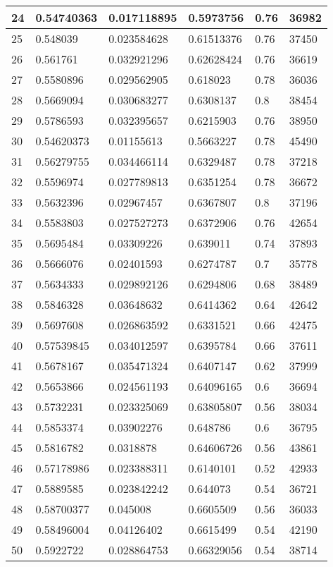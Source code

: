 \begin{longtable}{|l|l|l|l|l|l|}
24 & 0.54740363 & 0.017118895 & 0.5973756 & 0.76 & 36982 \\ \hline 
25 & 0.548039 & 0.023584628 & 0.61513376 & 0.76 & 37450 \\ \hline 
26 & 0.561761 & 0.032921296 & 0.62628424 & 0.76 & 36619 \\ \hline 
27 & 0.5580896 & 0.029562905 & 0.618023 & 0.78 & 36036 \\ \hline 
28 & 0.5669094 & 0.030683277 & 0.6308137 & 0.8 & 38454 \\ \hline 
29 & 0.5786593 & 0.032395657 & 0.6215903 & 0.76 & 38950 \\ \hline 
30 & 0.54620373 & 0.01155613 & 0.5663227 & 0.78 & 45490 \\ \hline 
31 & 0.56279755 & 0.034466114 & 0.6329487 & 0.78 & 37218 \\ \hline 
32 & 0.5596974 & 0.027789813 & 0.6351254 & 0.78 & 36672 \\ \hline 
33 & 0.5632396 & 0.02967457 & 0.6367807 & 0.8 & 37196 \\ \hline 
34 & 0.5583803 & 0.027527273 & 0.6372906 & 0.76 & 42654 \\ \hline 
35 & 0.5695484 & 0.03309226 & 0.639011 & 0.74 & 37893 \\ \hline 
36 & 0.5666076 & 0.02401593 & 0.6274787 & 0.7 & 35778 \\ \hline 
37 & 0.5634333 & 0.029892126 & 0.6294806 & 0.68 & 38489 \\ \hline 
38 & 0.5846328 & 0.03648632 & 0.6414362 & 0.64 & 42642 \\ \hline 
39 & 0.5697608 & 0.026863592 & 0.6331521 & 0.66 & 42475 \\ \hline 
40 & 0.57539845 & 0.034012597 & 0.6395784 & 0.66 & 37611 \\ \hline 
41 & 0.5678167 & 0.035471324 & 0.6407147 & 0.62 & 37999 \\ \hline 
42 & 0.5653866 & 0.024561193 & 0.64096165 & 0.6 & 36694 \\ \hline 
43 & 0.5732231 & 0.023325069 & 0.63805807 & 0.56 & 38034 \\ \hline 
44 & 0.5853374 & 0.03902276 & 0.648786 & 0.6 & 36795 \\ \hline 
45 & 0.5816782 & 0.0318878 & 0.64606726 & 0.56 & 43861 \\ \hline 
46 & 0.57178986 & 0.023388311 & 0.6140101 & 0.52 & 42933 \\ \hline 
47 & 0.5889585 & 0.023842242 & 0.644073 & 0.54 & 36721 \\ \hline 
48 & 0.58700377 & 0.045008 & 0.6605509 & 0.56 & 36033 \\ \hline 
49 & 0.58496004 & 0.04126402 & 0.6615499 & 0.54 & 42190 \\ \hline 
50 & 0.5922722 & 0.028864753 & 0.66329056 & 0.54 & 38714 \\ \hline 
\end{longtable}